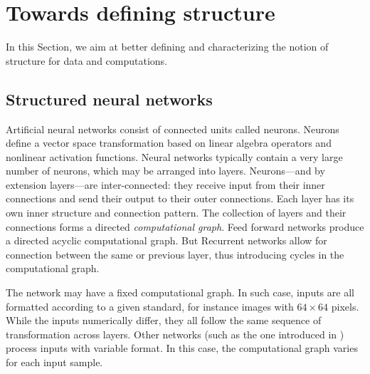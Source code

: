 


\section{Towards defining structure}


In this Section, we aim at better defining and characterizing the notion of structure for data and computations.

\subsection{Structured neural networks} 

Artificial neural networks consist of connected units called neurons. Neurons define a vector space transformation based on linear algebra operators and nonlinear activation functions. Neural networks typically contain a very large number of neurons, which may be arranged into layers. Neurons—and by extension layers—are inter-connected: they receive input from their inner connections and send their output to their outer connections. Each layer has its own inner structure and connection pattern. The collection of layers and their connections forms a directed \textit{computational graph}. Feed forward networks produce a directed acyclic computational graph. But Recurrent networks allow for connection between the same or previous layer, thus introducing cycles in the computational graph.

The network may have a fixed computational graph. In such case, inputs are all formatted according to a given standard, for instance images with $64 \times 64$ pixels. While the inputs numerically differ, they all follow the same sequence of transformation across layers. Other networks (such as the one introduced in ) process inputs with variable format. In this case, the computational graph varies for each input sample.

